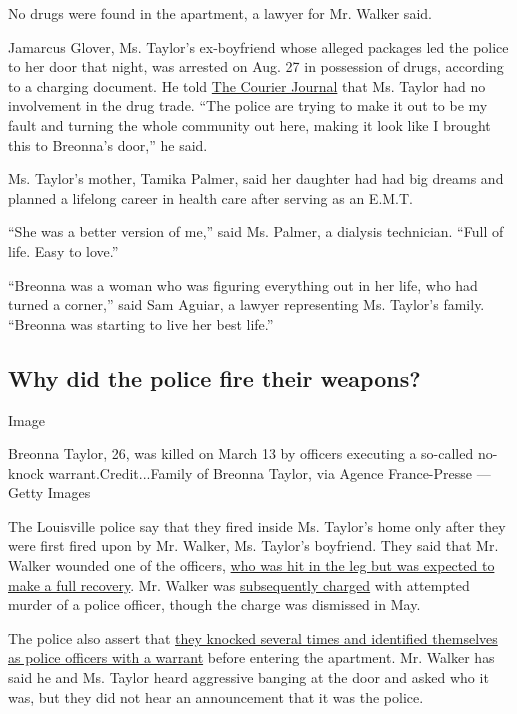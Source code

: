 No drugs were found in the apartment, a lawyer for Mr. Walker said.

Jamarcus Glover, Ms. Taylor's ex-boyfriend whose alleged packages led
the police to her door that night, was arrested on Aug. 27 in possession
of drugs, according to a charging document. He told
\href{https://www.courier-journal.com/story/news/local/breonna-taylor/2020/08/27/breonna-taylor-had-no-ties-drugs-ex-boyfriend-says/5641151002/}{The
Courier Journal} that Ms. Taylor had no involvement in the drug trade.
``The police are trying to make it out to be my fault and turning the
whole community out here, making it look like I brought this to
Breonna's door,'' he said.

Ms. Taylor's mother, Tamika Palmer, said her daughter had had big dreams
and planned a lifelong career in health care after serving as an E.M.T.

``She was a better version of me,'' said Ms. Palmer, a dialysis
technician. ``Full of life. Easy to love.''

``Breonna was a woman who was figuring everything out in her life, who
had turned a corner,'' said Sam Aguiar, a lawyer representing Ms.
Taylor's family. ``Breonna was starting to live her best life.''

\hypertarget{why-did-the-police-fire-their-weapons}{%
\subsection{Why did the police fire their
weapons?}\label{why-did-the-police-fire-their-weapons}}

Image

Breonna Taylor, 26, was killed on March 13 by officers executing a
so-called no-knock warrant.Credit...Family of Breonna Taylor, via Agence
France-Presse --- Getty Images

The Louisville police say that they fired inside Ms. Taylor's home only
after they were first fired upon by Mr. Walker, Ms. Taylor's boyfriend.
They said that Mr. Walker wounded one of the officers,
\href{https://www.facebookcorewwwi.onion/LMPD.ky/videos/206839417221050/}{who
was hit in the leg but was expected to make a full recovery}. Mr. Walker
was
\href{https://www.facebookcorewwwi.onion/LMPD.ky/videos/206839417221050/}{subsequently
charged} with attempted murder of a police officer, though the charge
was dismissed in May.

The police also assert that
\href{https://www.facebookcorewwwi.onion/LMPD.ky/videos/206839417221050/}{they
knocked several times and identified themselves as police officers with
a warrant} before entering the apartment. Mr. Walker has said he and Ms.
Taylor heard aggressive banging at the door and asked who it was, but
they did not hear an announcement that it was the police.

